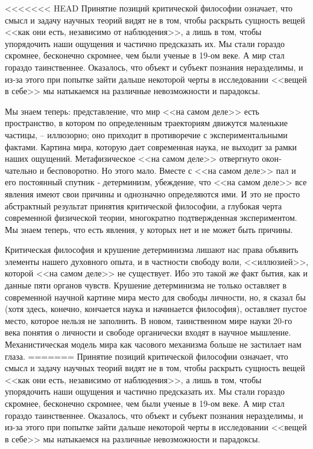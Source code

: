 \documentclass{book}
\begin{document}
<<<<<<< HEAD
Принятие позиций критической философии означает, что смысл и задачу научных теорий видят не в том, чтобы раскрыть сущность вещей <<как они есть, независимо от наблюдения>>, а лишь в том, чтобы упорядочить наши ощущения и частично предсказать их. Мы стали гораздо скромнее, бесконечно скром­нее, чем были ученые в 19‑ом веке. А мир стал гораздо таинст­веннее. Оказалось, что объект и субъект познания неразделимы, и из‑за этого при попытке зайти дальше некоторой черты в ис­следовании <<вещей в себе>> мы натыкаемся на различные невоз­можности и парадоксы.

Мы знаем теперь: представление, что мир <<на самом деле>> есть пространство, в котором по определенным траекториям движутся маленькие частицы, -- иллюзорно; оно приходит в противоречие с экспериментальными фактами. Картина мира, которую дает современная наука, не выходит за рамки наших ощущений. Метафизическое <<на самом деле>> отвергнуто окон­чательно и бесповоротно. Но этого мало. Вместе с <<на самом деле>> пал и его постоянный спутник ‑ детерминизм, убежде­ние, что <<на самом деле>> все явления имеют свои причины и однозначно определяются ими. И это не просто абстрактный результат принятия критической философии, а глубокая черта современной физической теории, многократно подтвержденная экспериментом. Мы знаем теперь, что есть явления, у которых нет и не может быть причины.

Критическая философия и крушение детерминизма лишают нас права объявить элементы нашего духовного опыта, и в частности свободу воли, <<иллюзией>>, которой <<на самом деле>> не существует. Ибо это такой же факт бытия, как и данные пяти органов чувств. Крушение детерминизма не только оставляет в современной научной картине мира место для свободы личности, но, я сказал бы (хотя здесь, конечно, кончается наука и начинается философия), оставляет пустое  место, которое нельзя не заполнить.  В новом, таинственном мире науки 20‑го века понятия о личности и свободе органически входят в науч­ное мышление. Механистическая модель мира как часового механизма больше не застилает нам глаза.
=======
Принятие позиций критической философии означает, что смысл и задачу научных теорий видят не в том, чтобы раскрыть сущность вещей <<как они есть, независимо от наблюдения>>, а лишь в том, чтобы упорядочить наши ощущения и частично предсказать их. Мы стали гораздо скромнее, бесконечно скром­нее, чем были ученые в 19-ом веке. А мир стал гораздо таинст­веннее. Оказалось, что объект и субъект познания неразделимы, и из-за этого при попытке зайти дальше некоторой черты в ис­следовании <<вещей в себе>> мы натыкаемся на различные невоз­можности и парадоксы.
\end{document}
